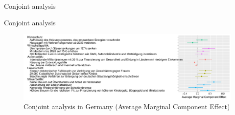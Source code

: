 \documentclass[aspectratio=169,xcolor=dvipsnames, 11pt,mathserif]{beamer}
\begin{document}
\begin{frame}{Conjoint analysis}
\end{frame}

\begin{frame}{Conjoint analysis\label{conjoint_country}} 
    \begin{figure}
\caption{Conjoint analysis in Germany (Average Marginal Component Effect) \hyperlink{conjoint_countries}{}} 
\includegraphics[width=\textwidth]{../figures/DE/conjoint_DE.pdf}
\end{figure}
\end{frame}
\end{document}
